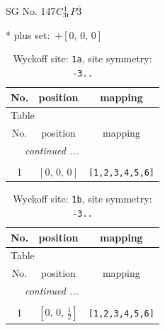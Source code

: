 \documentclass[fleqn,8pt]{jsarticle}
\begin{document}
\setcounter{MaxMatrixCols}{32}

\renewcommand{\tablename}{Table~}
\renewcommand{\figurename}{Figure~}
\begin{center}
\LARGE
SG No. 147\quad$C_{\rm 3i}^{1}$\quad$P\bar{3}$\quad[ trigonal ]
\end{center}
* plus set:\,\,\,$+\left[ 0,\, 0,\, 0 \right]$
\renewcommand{\arraystretch}{1.2}
\begin{longtable}{ccc}
\caption{Wyckoff site: {\tt 1a}, site symmetry: {\tt -3..}}
 \\
 \hline \hline
No. & position & mapping \\ \hline \endfirsthead

\multicolumn{2}{l}{\tablename\ \thetable{}} \\
 \hline \hline
No. & position & mapping \\ \hline \endhead

 \hline \hline
\multicolumn{2}{r}{\footnotesize\it continued ...} \\ \endfoot

 \hline \hline
\multicolumn{2}{r}{} \\ \endlastfoot

1 & $\left[ 0,\, 0,\, 0 \right]$ & {\tt [1,2,3,4,5,6]} \\
\end{longtable}
\renewcommand{\arraystretch}{1.2}
\begin{longtable}{ccc}
\caption{Wyckoff site: {\tt 1b}, site symmetry: {\tt -3..}}
 \\
 \hline \hline
No. & position & mapping \\ \hline \endfirsthead

\multicolumn{2}{l}{\tablename\ \thetable{}} \\
 \hline \hline
No. & position & mapping \\ \hline \endhead

 \hline \hline
\multicolumn{2}{r}{\footnotesize\it continued ...} \\ \endfoot

 \hline \hline
\multicolumn{2}{r}{} \\ \endlastfoot

1 & $\left[ 0,\, 0,\, \frac{1}{2} \right]$ & {\tt [1,2,3,4,5,6]} \\
\end{longtable}
\renewcommand{\arraystretch}{1.2}
\end{document}
